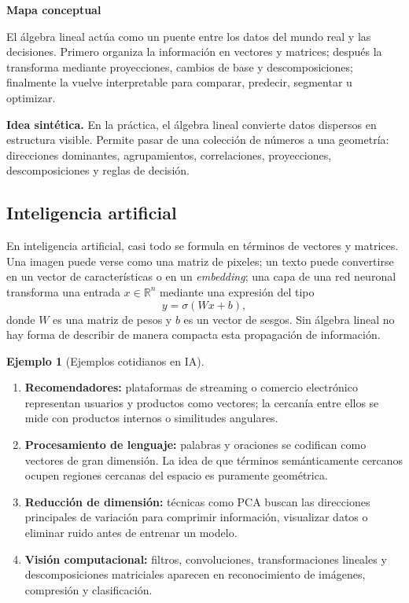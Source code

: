 \documentclass[10pt,a4paper,oneside]{article}
\theoremstyle{plain}
\theoremstyle{definition}
\newtheorem{example}[theorem]{Ejemplo}
\theoremstyle{remark}
\newcommand{\R}{\mathbb{R}}
\begin{document}
\begin{center}
\par\vspace{2.0em}
\begin{minipage}{0.88\textwidth}
\centering
\setlength{\parskip}{0.45em}
{\small\bfseries\color{ihesblue}Mapa conceptual}

{\small El álgebra lineal actúa como un puente entre los datos del mundo real y las decisiones. Primero organiza la información en vectores y matrices; después la transforma mediante proyecciones, cambios de base y descomposiciones; finalmente la vuelve interpretable para comparar, predecir, segmentar u optimizar.}
\end{minipage}
\end{center}

\vspace{1.0em}

\begin{summaryBox}
\textbf{Idea sintética.} En la práctica, el álgebra lineal convierte datos dispersos en estructura visible. Permite pasar de una colección de números a una geometría: direcciones dominantes, agrupamientos, correlaciones, proyecciones, descomposiciones y reglas de decisión.
\end{summaryBox}

\subsection{Inteligencia artificial}

En inteligencia artificial, casi todo se formula en términos de vectores y matrices. Una imagen puede verse como una matriz de pixeles; un texto puede convertirse en un vector de características o en un \emph{embedding}; una capa de una red neuronal transforma una entrada $x\in\R^n$ mediante una expresión del tipo
\[
y=\sigma(Wx+b),
\]
donde $W$ es una matriz de pesos y $b$ es un vector de sesgos. Sin álgebra lineal no hay forma de describir de manera compacta esta propagación de información.

\begin{example}[Ejemplos cotidianos en IA]
\begin{enumerate}[label=\textup{(\arabic*)}]
\item \textbf{Recomendadores:} plataformas de streaming o comercio electrónico representan usuarios y productos como vectores; la cercanía entre ellos se mide con productos internos o similitudes angulares.
\item \textbf{Procesamiento de lenguaje:} palabras y oraciones se codifican como vectores de gran dimensión. La idea de que términos semánticamente cercanos ocupen regiones cercanas del espacio es puramente geométrica.
\item \textbf{Reducción de dimensión:} técnicas como PCA buscan las direcciones principales de variación para comprimir información, visualizar datos o eliminar ruido antes de entrenar un modelo.
\item \textbf{Visión computacional:} filtros, convoluciones, transformaciones lineales y descomposiciones matriciales aparecen en reconocimiento de imágenes, compresión y clasificación.
\end{enumerate}
\end{example}
\end{document}
